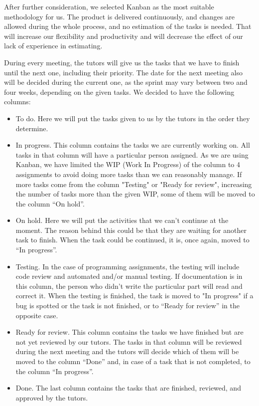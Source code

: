After further consideration, we selected Kanban as the most suitable methodology for us. The product is delivered continuously, and changes are allowed during the whole process, and no estimation of the tasks is needed. That will increase our flexibility and productivity and will decrease the effect of our lack of experience in estimating.

During every meeting, the tutors will give us the tasks that we have to finish until the next one, including their priority. The date for the next meeting also will be decided during the current one, as the sprint may vary between two and four weeks, depending on the given tasks. We decided to have the following columns:
\begin{itemize}
\item To do. Here we will put the tasks given to us by the tutors in the order they determine. 

\item In progress. This column contains the tasks we are currently working on. All tasks in that column will have a particular person assigned. As we are using Kanban, we have limited the WIP (Work In Progress) of the column to 4 assignments to avoid doing more tasks than we can reasonably manage. If more tasks come from the column "Testing" or "Ready for review", increasing the number of tasks more than the given WIP, some of them will be moved to the column ``On hold''.

\item On hold. Here we will put the activities that we can't continue at the moment. The reason behind this could be that they are waiting for another task to finish. When the task could be continued, it is, once again, moved to ``In progress''.

\item Testing. In the case of programming assignments, the testing will include code review and automated and/or manual testing. 
If documentation is in this column, the person who didn't write the particular part will read and correct it. 
When the testing is finished, the task is moved to "In progress" if a bug is spotted or the task is not finished, or to ``Ready for review'' in the opposite case. 

\item Ready for review.  This column contains the tasks we have finished but are not yet reviewed by our tutors. The tasks in that column will be reviewed during the next meeting and the tutors will decide which of them will be moved to the column ``Done'' and, in case of a task that is not completed, to the column ``In progress''.
\item Done. The last column contains the tasks that are finished, reviewed, and approved by the tutors.
\end{itemize}

